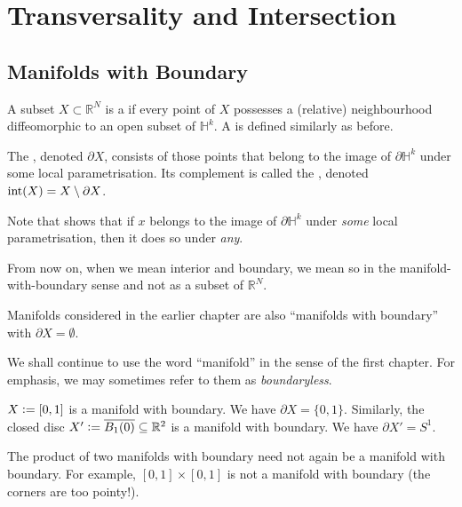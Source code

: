 \documentclass[12pt]{article}
\begin{document}
\section{Transversality and Intersection}
\subsection{Manifolds with Boundary}

\begin{defn}
	A subset $X \subset \mathbb{R}^{N}$ is a  if every point of $X$ possesses a (relative) neighbourhood diffeomorphic to an open subset of $\mathbb{H}^{k}$. A  is defined similarly as before.

	The , denoted $\partial X$, consists of those points that belong to the image of $\partial \mathbb{H}^{k}$ under some local parametrisation. Its complement is called the , denoted $\Int(X) = X \setminus \partial X$.
\end{defn}
Note that  shows that if $x$ belongs to the image of $\partial \mathbb{H}^{k}$ under \emph{some} local parametrisation, then it does so under \emph{any}.

From now on, when we mean interior and boundary, we mean so in the manifold-with-boundary sense and not as a subset of $\mathbb{R}^{N}$. 

\begin{rem}
	Manifolds considered in the earlier chapter are also ``manifolds with boundary'' with $\partial X = \emptyset$.

	We shall continue to use the word ``manifold'' in the sense of the first chapter. For emphasis, we may sometimes refer to them as \emph{boundaryless}.
\end{rem}

\begin{ex}
	$X \vcentcolon= [0, 1]$ is a manifold with boundary. We have $\partial X = \{0, 1\}$. \newline
	Similarly, the closed disc $X' \vcentcolon= \overline{B_{1}(0)} \subset \mathbb{R}^{2}$ is a manifold with boundary. We have $\partial X' = S^{1}$.

	The product of two manifolds with boundary need not again be a manifold with boundary. For example, $[0, 1] \times [0, 1]$ is not a manifold with boundary (the corners are too pointy!).
\end{ex}
\end{document}
